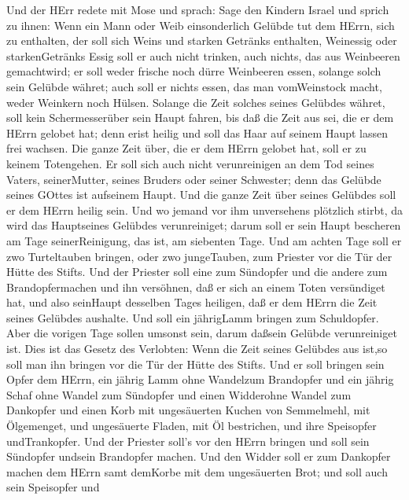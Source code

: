  Und der HErr redete mit Mose und sprach:  Sage
den Kindern Israel und sprich zu ihnen: Wenn ein Mann oder Weib
einsonderlich Gelübde tut dem HErrn, sich zu enthalten,  der
soll sich Weins und starken Getränks enthalten, Weinessig oder
starkenGetränks Essig soll er auch nicht trinken, auch nichts, das aus
Weinbeeren gemachtwird; er soll weder frische noch dürre Weinbeeren
essen,  solange solch sein Gelübde währet; auch soll er
nichts essen, das man vomWeinstock macht, weder Weinkern noch Hülsen.
 Solange die Zeit solches seines Gelübdes währet, soll kein
Schermesserüber sein Haupt fahren, bis daß die Zeit aus sei, die er dem
HErrn gelobet hat; denn erist heilig und soll das Haar auf seinem Haupt
lassen frei wachsen.  Die ganze Zeit über, die er dem HErrn
gelobet hat, soll er zu keinem Totengehen.  Er soll sich
auch nicht verunreinigen an dem Tod seines Vaters, seinerMutter, seines
Bruders oder seiner Schwester; denn das Gelübde seines GOttes ist
aufseinem Haupt.  Und die ganze Zeit über seines Gelübdes
soll er dem HErrn heilig sein.  Und wo jemand vor ihm
unversehens plötzlich stirbt, da wird das Hauptseines Gelübdes
verunreiniget; darum soll er sein Haupt bescheren am Tage
seinerReinigung, das ist, am siebenten Tage.  Und am achten
Tage soll er zwo Turteltauben bringen, oder zwo jungeTauben, zum
Priester vor die Tür der Hütte des Stifts.  Und der
Priester soll eine zum Sündopfer und die andere zum Brandopfermachen und
ihn versöhnen, daß er sich an einem Toten versündiget hat, und also
seinHaupt desselben Tages heiligen,  daß er dem HErrn die
Zeit seines Gelübdes aushalte. Und soll ein jährigLamm bringen zum
Schuldopfer. Aber die vorigen Tage sollen umsonst sein, darum daßsein
Gelübde verunreiniget ist.  Dies ist das Gesetz des
Verlobten: Wenn die Zeit seines Gelübdes aus ist,so soll man ihn bringen
vor die Tür der Hütte des Stifts.  Und er soll bringen sein
Opfer dem HErrn, ein jährig Lamm ohne Wandelzum Brandopfer und ein
jährig Schaf ohne Wandel zum Sündopfer und einen Widderohne Wandel zum
Dankopfer  und einen Korb mit ungesäuerten Kuchen von
Semmelmehl, mit Ölgemenget, und ungesäuerte Fladen, mit Öl bestrichen,
und ihre Speisopfer undTrankopfer.  Und der Priester soll's
vor den HErrn bringen und soll sein Sündopfer undsein Brandopfer machen.
 Und den Widder soll er zum Dankopfer machen dem HErrn samt
demKorbe mit dem ungesäuerten Brot; und soll auch sein Speisopfer und
